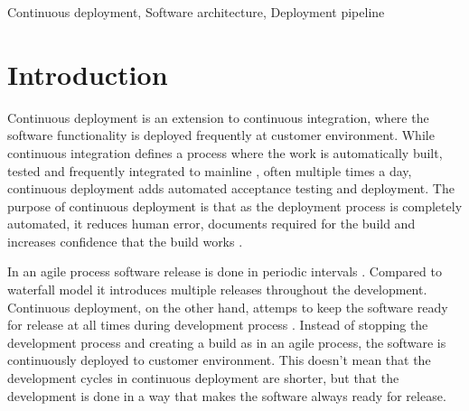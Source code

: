 \documentclass[conference]{IEEEtran}
\begin{document}
\begin{IEEEkeywords}
Continuous deployment, Software architecture, Deployment pipeline
\end{IEEEkeywords}

%


\IEEEpeerreviewmaketitle




%



\section{Introduction} %

Continuous deployment is an extension to continuous integration, where the software functionality is deployed frequently at customer environment. While continuous integration defines a process where the work is automatically built, tested and frequently integrated to mainline \cite{fowler2006continuous}, often multiple times a day, continuous deployment adds automated acceptance testing and deployment. The purpose of continuous deployment is that as the deployment process is completely automated, it reduces human error, documents required for the build and increases confidence that the build works \cite{cdbook}. 

In an agile process software release is done in periodic intervals \cite{cockburn2002agile}. Compared to waterfall model it introduces multiple releases throughout the development. Continuous deployment, on the other hand, attemps to keep the software ready for release at all times during development process \cite{cdbook}. Instead of stopping the development process and creating a build as in an agile process, the software is continuously deployed to customer environment. This doesn't mean that the development cycles in continuous deployment are shorter, but that the development is done in a way that makes the software always ready for release.
\end{document}
